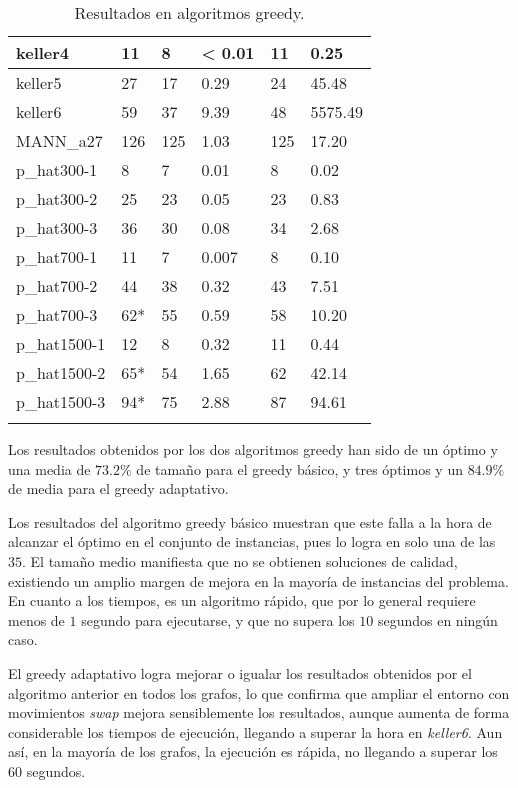 \begin{small}
\begin{longtable}{l l l l l l}
  keller4            & 11 & 8 & < 0.01 & 11 & 0.25 \\ \hline
  keller5            & 27 & 17 & 0.29 & 24 & 45.48 \\ \hline
  keller6            & 59 & 37 & 9.39 & 48 & 5575.49 \\ \hline
  MANN\_a27          & 126 & 125 & 1.03 & 125 & 17.20 \\ \hline
  p\_hat300-1        & 8 & 7 & 0.01 & 8 & 0.02 \\ \hline
  p\_hat300-2        & 25 & 23 & 0.05 & 23 & 0.83 \\ \hline
  p\_hat300-3        & 36 & 30 & 0.08 & 34 & 2.68 \\ \hline
  p\_hat700-1        & 11 & 7 & 0.007 & 8 & 0.10 \\ \hline
  p\_hat700-2        & 44 & 38 & 0.32 & 43 & 7.51 \\ \hline
  p\_hat700-3        & 62* & 55 & 0.59 & 58 & 10.20 \\ \hline
  p\_hat1500-1       & 12 & 8 & 0.32 & 11 & 0.44 \\ \hline
  p\_hat1500-2       & 65* & 54 & 1.65 & 62 & 42.14 \\ \hline
  p\_hat1500-3       & 94* & 75 & 2.88 & 87 & 94.61 \\ \hline
  \caption{Resultados en algoritmos greedy.}
\end{longtable}
\end{small}

Los resultados obtenidos por los dos algoritmos greedy han sido de un óptimo y una media
de $73.2\%$ de tamaño para el greedy básico, y tres óptimos y un $84.9\%$ de media
para el greedy adaptativo.

Los resultados del algoritmo greedy básico muestran que este falla a la hora de
alcanzar el óptimo en el conjunto de instancias, pues lo logra en solo una de las $35$.
El tamaño medio manifiesta que no se obtienen soluciones de calidad, existiendo
un amplio margen de mejora en la mayoría de instancias del problema. En cuanto a
los tiempos, es un algoritmo rápido, que por lo general requiere menos de $1$
segundo para ejecutarse, y que no supera los $10$ segundos en ningún caso.

El greedy adaptativo logra mejorar o igualar los resultados obtenidos por el algoritmo
anterior en todos los grafos, lo que confirma que ampliar el entorno con movimientos
\textit{swap} mejora sensiblemente los resultados, aunque aumenta de forma considerable
los tiempos de ejecución, llegando a superar la hora en \textit{keller6}. Aun así,
en la mayoría de los grafos, la ejecución es rápida, no llegando a superar los $60$
segundos.

